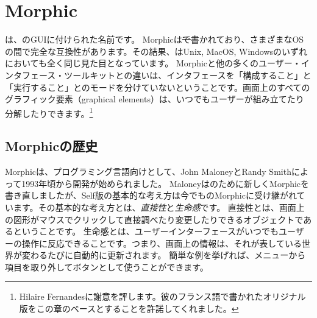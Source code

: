 \documentclass[a4paper,10pt,twoside]{book}
\begin{document}
	\sloppy
\fi
\chapter{Morphic}


は、\pharo のGUIに付けられた名前です。
Morphicは\st で書かれており、さまざまなOSの間で完全な互換性があります。その結果、\pharo はUnix, MacOS, Windowsのいずれにおいても全く同じ見た目となっています。
Morphicと他の多くのユーザー・インタフェース・ツールキットとの違いは、インタフェースを「構成すること」と「実行すること」とのモードを分けていないということです。画面上のすべてのグラフィック要素（graphical elements）は、いつでもユーザーが組み立てたり分解したりできます。\footnote{Hilaire Fernandesに謝意を評します。彼のフランス語で書かれたオリジナル版をこの章のベースとすることを許諾してくれました。}



\section{Morphicの歴史}

Morphicは、プログラミング言語向けとして、John MaloneyとRandy Smithによって1993年頃から開発が始められました。
Maloneyは\squeak のために新しくMorphicを書き直しましたが、Self版の基本的な考え方は今でも\pharo のMorphicに受け継がれています。その基本的な考え方とは、\emph{直接性}と\emph{生命感}です。
直接性とは、画面上の図形がマウスでクリックして直接調べたり変更したりできるオブジェクトであるということです。
生命感とは、ユーザーインターフェースがいつでもユーザーの操作に反応できることです。つまり、画面上の情報は、それが表している世界が変わるたびに自動的に更新されます。
簡単な例を挙げれば、メニューから項目を取り外してボタンとして使うことができます。
\end{document}
